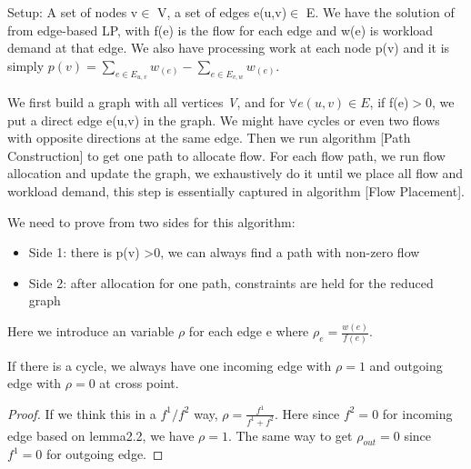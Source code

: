 \documentclass[twoside,leqno, 11pt]{article}
\begin{document}
Setup:
A set of nodes  v$\in$ V, a set of edges e(u,v)$\in$ E. We have the solution of from edge-based LP, with 
f(e) is the flow for each edge and w(e) is workload demand at that edge. We also have processing work at each node p(v) and it is simply $p(v) = 
\sum\limits_{e \in E_{u, v} }w_(e) - \sum\limits_{e \in E_{v, w} }w_(e)  $.

We first build a graph with all vertices \textit{V}, and for $\forall e(u,v) \in E $, if f(e)$ >$0, we put a direct edge e(u,v) in the graph. We might have cycles or even two flows with opposite directions at the same edge. Then we run algorithm [Path Construction] to get one path to allocate flow. For each flow path, we run flow allocation and update the graph, we exhaustively do it until we place all flow and workload demand, this step is essentially captured in algorithm [Flow Placement]. 

We need to prove from two sides for this algorithm: 
\begin{itemize}
  \item {Side 1: there is p(v) >0, we can always find a path with non-zero flow}
   \item {Side 2: after allocation for one path, constraints are held for the reduced graph} 
\newline
\end{itemize}
Here we introduce an variable $\rho$ for each edge e where $\rho_{e} = \frac{ w(e)}{f(e)}$.
\begin{lemma}
If there is a cycle, we always have one incoming edge with $\rho =1$ and outgoing edge with $\rho =0$ at cross point.
\end{lemma}
\begin{proof}
If we think this in a $f^1/f^2$ way, $\rho = \frac{ f^1} {f^1+f^2 }$. Here since $f^2=0$ for incoming edge based on lemma2.2, we have $\rho=1$. The same way to get $\rho_{out}=0$ since $f^1=0$ for outgoing edge. 
\end{proof}
\end{document}
